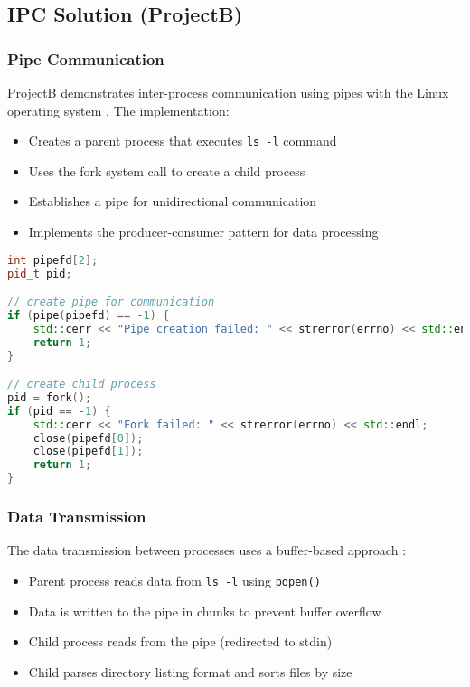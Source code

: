 \documentclass[12pt]{article}
\begin{document}
\subsection{IPC Solution (ProjectB)}
\subsubsection{Pipe Communication}
ProjectB demonstrates inter-process communication using pipes with the Linux operating system \cite{posix_pipe}. The implementation:

\begin{itemize}
    \item Creates a parent process that executes \texttt{ls -l} command
    \item Uses the fork system call \cite{posix_fork} to create a child process
    \item Establishes a pipe for unidirectional communication
    \item Implements the producer-consumer pattern for data processing
\end{itemize}

\begin{lstlisting}[language=C++, caption=Pipe Creation and Process Forking]
int pipefd[2];
pid_t pid;

// create pipe for communication
if (pipe(pipefd) == -1) {
    std::cerr << "Pipe creation failed: " << strerror(errno) << std::endl;
    return 1;
}

// create child process
pid = fork();
if (pid == -1) {
    std::cerr << "Fork failed: " << strerror(errno) << std::endl;
    close(pipefd[0]);
    close(pipefd[1]);
    return 1;
}
\end{lstlisting}

\subsubsection{Data Transmission}
The data transmission between processes uses a buffer-based approach \cite{ipc_cpp}:

\begin{itemize}
    \item Parent process reads data from \texttt{ls -l} using \texttt{popen()}
    \item Data is written to the pipe in chunks to prevent buffer overflow
    \item Child process reads from the pipe (redirected to stdin)
    \item Child parses directory listing format and sorts files by size
\end{itemize}
\end{document}
